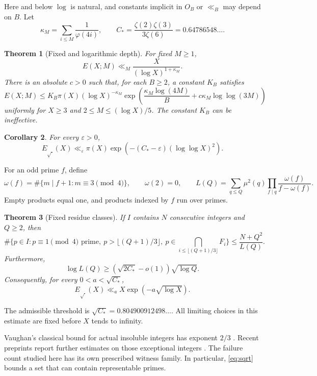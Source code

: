 \documentclass[11pt,a4paper]{amsart}
\newtheorem{theorem}{Theorem}[section]
\newtheorem{corollary}[theorem]{Corollary}
\theoremstyle{definition}\newtheorem{definition}[theorem]{Definition}
\newcommand{\eps}{\varepsilon}
\begin{document}
Here and below $\log$ is natural, and constants implicit in $O_B$ or
$\ll_B$ may depend on $B$. Let
\[
 \kappa_M=\sum_{i\le M}\frac1{\varphi(4i)},\qquad
 C_*=\frac{\zeta(2)\zeta(3)}{3\zeta(6)}=0.64786548\ldots .
\]
\begin{theorem}[Fixed and logarithmic depth]\label{thm:uniform}
For fixed $M\ge1$,
\begin{equation}\label{eq:fixed}
 E(X;M)\ll_M \frac{X}{(\log X)^{1+\kappa_M}}.
\end{equation}
There is an absolute $c>0$ such that, for each $B\ge2$, a constant $K_B$
satisfies
\begin{equation}\label{eq:uniform}
 E(X;M)\le K_B\pi(X)(\log X)^{-\kappa_M}
 \exp\left(\frac{\kappa_M\log(4M)}B+
             c\kappa_M\log\log(3M)\right)
\end{equation}
uniformly for $X\ge3$ and $2\le M\le(\log X)/5$.
The constant $K_B$ can be ineffective.
\end{theorem}
\begin{corollary}\label{cor:loglog}
For every $\eps>0$,
\[
 E_{\sqrt{\ }}(X)\ll_\eps
 \pi(X)\exp(-(C_*-\eps)(\log\log X)^2).
\]
\end{corollary}

For an odd prime $f$, define
\[
 \omega(f)=\#\{m\mid f+1:m\equiv3\pmod4\},\qquad \omega(2)=0,
 \qquad
 L(Q)=\sum_{q\le Q}\mu^2(q)\prod_{f\mid q}
                       \frac{\omega(f)}{f-\omega(f)}.
\]
Empty products equal one, and products indexed by $f$ run over primes.
\begin{theorem}[Fixed residue classes]\label{thm:large}
If $I$ contains $N$ consecutive integers and $Q\ge2$, then
\[
 \#\{p\in I:p\equiv1\pmod4\text{ prime},\
       p>\lfloor(Q+1)/3\rfloor,\
       p\in\bigcap_{i\le\lfloor(Q+1)/3\rfloor} F_i\}
 \le\frac{N+Q^2}{L(Q)}.
\]
Furthermore,
\begin{equation}\label{eq:L}
 \log L(Q)\ge(\sqrt{2C_*}-o(1))\sqrt{\log Q}.
\end{equation}
Consequently, for every $0<a<\sqrt{C_*}$,
\begin{equation}\label{eq:sqrt}
 E_{\sqrt{\ }}(X)\ll_a X\exp(-a\sqrt{\log X}).
\end{equation}
\end{theorem}
The admissible threshold is $\sqrt{C_*}=0.804900912498\ldots$.
All limiting choices in this estimate are fixed before $X$ tends to infinity.

Vaughan's classical bound for actual insoluble integers has exponent
$2/3$ \cite{Vaughan}. Recent preprints report further estimates on
those exceptional integers \cite{DahanComposite,Trybushnyi}.
The failure count studied here has its own prescribed witness
family. In particular, \eqref{eq:sqrt} bounds a set that can contain
representable primes.
\end{document}

